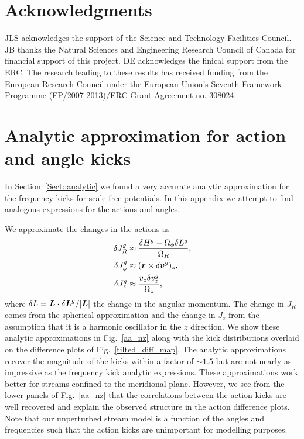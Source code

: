 \documentclass[useAMS,usenatbib,fleqn,a4paper]{mn2e}
\newcommand{\bs}[1]{\bmath{#1}}
\begin{document}
\section*{Acknowledgments}
JLS acknowledges the support of the Science and Technology Facilities
Council. JB thanks the Natural Sciences and Engineering Research
Council of Canada for financial support of this project. DE acknowledges the finical support from the ERC. The research leading to these
results has received funding from the European Research Council under
the European Union's Seventh Framework Programme (FP/2007-2013)/ERC
Grant Agreement no. 308024.




\appendix

\section{Analytic approximation for action and angle kicks}\label{Appendix::Analytic}
In Section~\ref{Sect::analytic} we found a very accurate analytic approximation for the frequency kicks for scale-free potentials. In this appendix we attempt to find analogous expressions for the actions and angles.

We approximate the changes in the actions as
\begin{equation}
\begin{split}
\delta J^g_R &\approx \frac{\delta H^g - \Omega_\phi\delta L^g}{\Omega_R},\\
\delta J^g_\phi &\approx (\bs{r}\times\delta\bs{v}^g)_z,\\
\delta J^g_z &\approx \frac{v_z \delta v^g_z}{\Omega_z},
\end{split}
\label{dJ_an}
\end{equation}
where $\delta L = \bs{L}\cdot\delta\bs{L}^g/|\bs{L}|$ the change in the angular momentum. The change in $J_R$ comes from the spherical approximation and the change in $J_z$ from the assumption that it is a harmonic oscillator in the $z$ direction. We show these analytic approximations in Fig.~\ref{aa_nz} along with the kick distributions overlaid on the difference plots of Fig.~\ref{tilted_diff_map}. The analytic approximations recover the magnitude of the kicks within a factor of $\sim1.5$ but are not nearly as impressive as the frequency kick analytic expressions. These approximations work better for streams confined to the meridional plane. However, we see from the lower panels of Fig.~\ref{aa_nz} that the correlations between the action kicks are well recovered and explain the observed structure in the action difference plots. Note that our unperturbed stream model is a function of the angles and frequencies such that the action kicks are unimportant for modelling purposes.
\end{document}
